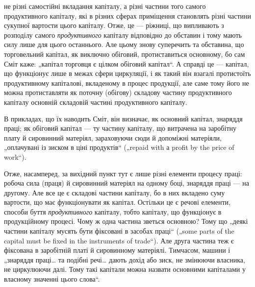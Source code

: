 \parcont{}  %
не різні самостійні вкладання капіталу, а різні частини того самого продуктивного
капіталу, які в різних сферах приміщення становлять різні
частини сукупної вартости цього капіталу. Отже, це — ріжниці, що випливають
з розподілу самого \emph{продуктивного} капіталу відповідно до
обставин і тому мають силу лише для цього останнього. Але цьому знову
суперечить та обставина, що торговельний капітал, як виключно обіговий,
протиставиться основному, бо сам Сміт каже: „капітал торговця є
цілком обіговий капітал“. А справді це — капітал, що функціонує лише
в межах сфери циркуляції, і як такий він взагалі протистоїть продуктивному
капіталові, вкладеному в процес продукції, але саме тому його не
можна протиставляти як поточну (обігову) складову частину продуктивного
капіталу основній складовій частині продуктивного капіталу.

В прикладах, що їх наводить Сміт, він визначає, як основний капітал,
знаряддя праці; як обіговий капітал — ту частину капіталу, що витрачена
на заробітну плату й сировинний матеріял, зараховуючи сюди й допоміжні
матеріяли, „оплачувані із зиском в ціні продуктів“ („repaid with а
profit by the price of work“).

Отже, насамперед, за вихідний пункт тут є лише різні елементи процесу
праці: робоча сила (праця) й сировинний матеріял на одному боці,
знаряддя праці — на другому. Але все це є складові частини капіталу, бо
в них вкладено суму вартости, що має функціонувати як капітал. Остільки
це є речові елементи, способи буття \emph{продуктивного} капіталу, тобто
капіталу, що функціонує в продукційному процесі. Чому ж одна частина
зветься основною? Тому що „деякі частини капіталу мусять бути фіксовані
в засобах праці“ („some parts of the capital must be fixed in the
instruments of trade“). Але друга частина теж є фіксована в заробітній
платі й сировинному матеріялі. Тимчасом, машини і „знаряддя праці\dots{} та
подібні речі\dots{} дають дохід або зиск, не змінюючи власника, не циркулюючи
далі. Тому такі капітали можна назвати основними капіталами у
власному значенні цього слова“.

